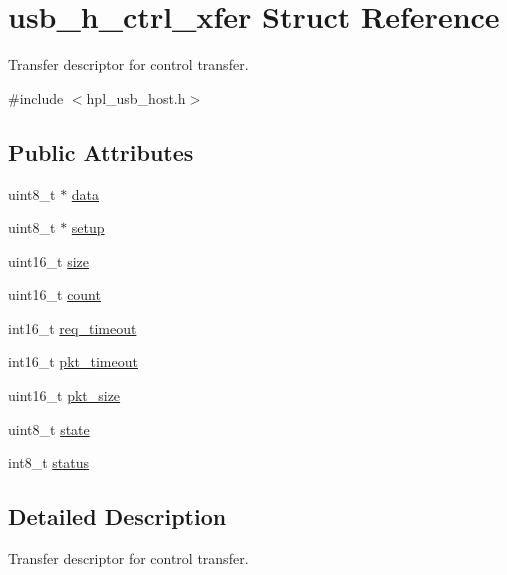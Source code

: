 \hypertarget{structusb__h__ctrl__xfer}{}\section{usb\+\_\+h\+\_\+ctrl\+\_\+xfer Struct Reference}
\label{structusb__h__ctrl__xfer}


Transfer descriptor for control transfer.  




{\ttfamily \#include $<$hpl\+\_\+usb\+\_\+host.\+h$>$}

\subsection*{Public Attributes}
\begin{DoxyCompactItemize}
\item 
uint8\+\_\+t $\ast$ \hyperlink{structusb__h__ctrl__xfer_a4e6a75132f6c0ca21aa0d4a9a44e9b9f}{data}
\item 
uint8\+\_\+t $\ast$ \hyperlink{structusb__h__ctrl__xfer_ad7bbc367de903eb4319432768b57442b}{setup}
\item 
uint16\+\_\+t \hyperlink{structusb__h__ctrl__xfer_a64df46630092535d3c706e816bf22116}{size}
\item 
uint16\+\_\+t \hyperlink{structusb__h__ctrl__xfer_ac1431c769926b00cf8ddfc60c7758271}{count}
\item 
int16\+\_\+t \hyperlink{structusb__h__ctrl__xfer_a1e524622e50fbcbdd4f2edc79bfdcd08}{req\+\_\+timeout}
\item 
int16\+\_\+t \hyperlink{structusb__h__ctrl__xfer_ad090b0b14e24af272f3ea6a1b8c1595d}{pkt\+\_\+timeout}
\item 
uint16\+\_\+t \hyperlink{structusb__h__ctrl__xfer_ac26b14086c38dc598d26b75faaf98a64}{pkt\+\_\+size}
\item 
uint8\+\_\+t \hyperlink{structusb__h__ctrl__xfer_a6a9bfe1f9da5dadc830a0e2b502eda69}{state}
\item 
int8\+\_\+t \hyperlink{structusb__h__ctrl__xfer_a07b31fc28b01ca6356b1dccbf6ec4443}{status}
\end{DoxyCompactItemize}


\subsection{Detailed Description}
Transfer descriptor for control transfer. 

